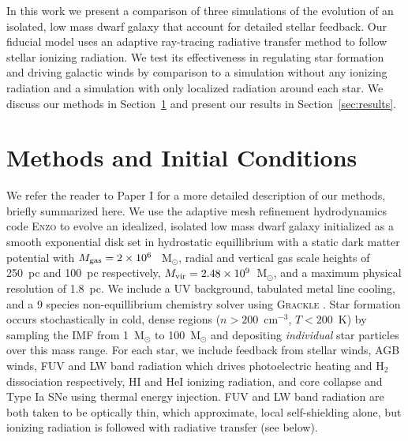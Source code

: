 \documentclass[twocolumn]{aastex62}
\begin{document}
In this work we present a comparison of three simulations of the evolution of an isolated, low mass dwarf galaxy that account for detailed stellar feedback. Our fiducial model uses an adaptive ray-tracing radiative transfer method to follow stellar ionizing radiation. We test its effectiveness in regulating star formation and driving galactic winds by comparison to a simulation without any ionizing radiation and a simulation with only localized radiation around each star. We discuss our methods in Section~\ref{sec:methods} and present our results in Section~\ref{sec:results}.

\section{Methods and Initial Conditions} \label{sec:methods}
We refer the reader to Paper I for a more detailed description of our methods, briefly summarized here. We use the adaptive mesh refinement hydrodynamics code \textsc{Enzo} \citep{Enzo} to evolve an idealized, isolated low mass dwarf galaxy initialized as a smooth exponential disk set in hydrostatic equillibrium with a static dark matter potential with $M_{\rm gas} = 2 \times 10^6~$~M$_{\odot}$, radial and vertical gas scale heights of 250~pc and 100~pc respectively, $M_{\rm vir} = 2.48 \times 10^9$~M$_{\odot}$, and a maximum physical resolution of 1.8~pc. We include a UV background, tabulated metal line cooling, and a 9 species non-equillibrium chemistry solver using \textsc{Grackle} \citep{Grackle}. Star formation occurs stochastically in cold, dense regions ($n > 200$~cm$^{-3}$, $T < 200$~K) by sampling the \cite{Salpeter1995} IMF from 1~M$_{\odot}$ to 100~M$_{\odot}$ and depositing \textit{individual} star particles over this mass range. For each star, we include feedback from stellar winds, AGB winds, FUV and LW band radiation which drives photoelectric heating and H$_2$ dissociation respectively, HI and HeI ionizing radiation, and core collapse and Type Ia SNe using thermal energy injection. FUV and LW band radiation are both taken to be optically thin, which approximate, local self-shielding alone, but ionizing radiation is followed with radiative transfer (see below). 
\end{document}
